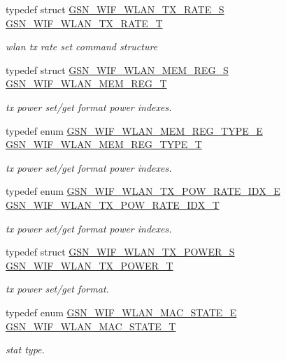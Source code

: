 \begin{DoxyCompactItemize}
typedef struct \hyperlink{a00409}{GSN\_\-WIF\_\-WLAN\_\-TX\_\-RATE\_\-S} \hyperlink{a00677_ga3248623873f75304b338528b6c711975}{GSN\_\-WIF\_\-WLAN\_\-TX\_\-RATE\_\-T}
\begin{DoxyCompactList}\small\item\em wlan tx rate set command structure \end{DoxyCompactList}\item 
typedef struct \hyperlink{a00390}{GSN\_\-WIF\_\-WLAN\_\-MEM\_\-REG\_\-S} \hyperlink{a00677_ga9d8aade166418018f4e609e679f7c603}{GSN\_\-WIF\_\-WLAN\_\-MEM\_\-REG\_\-T}
\begin{DoxyCompactList}\small\item\em tx power set/get format power indexes. \end{DoxyCompactList}\item 
typedef enum \hyperlink{a00677_ga7f657dfcb65c6810c23ae68bbca0b101}{GSN\_\-WIF\_\-WLAN\_\-MEM\_\-REG\_\-TYPE\_\-E} \hyperlink{a00677_gad221ad803b8f2c5c4e24ef1f0c0aa83c}{GSN\_\-WIF\_\-WLAN\_\-MEM\_\-REG\_\-TYPE\_\-T}
\begin{DoxyCompactList}\small\item\em tx power set/get format power indexes. \end{DoxyCompactList}\item 
typedef enum \hyperlink{a00677_ga75fc31972dc5127c4ee4b3e585ab0206}{GSN\_\-WIF\_\-WLAN\_\-TX\_\-POW\_\-RATE\_\-IDX\_\-E} \hyperlink{a00677_gaa864eedc8e384ed0ea49b62f267aff72}{GSN\_\-WIF\_\-WLAN\_\-TX\_\-POW\_\-RATE\_\-IDX\_\-T}
\begin{DoxyCompactList}\small\item\em tx power set/get format power indexes. \end{DoxyCompactList}\item 
typedef struct \hyperlink{a00408}{GSN\_\-WIF\_\-WLAN\_\-TX\_\-POWER\_\-S} \hyperlink{a00677_ga04f719a66b056bce000089417b9775bf}{GSN\_\-WIF\_\-WLAN\_\-TX\_\-POWER\_\-T}
\begin{DoxyCompactList}\small\item\em tx power set/get format. \end{DoxyCompactList}\item 
typedef enum \hyperlink{a00677_gaf26e714e09b57b3b2a5f21341613761d}{GSN\_\-WIF\_\-WLAN\_\-MAC\_\-STATE\_\-E} \hyperlink{a00677_gabb160daeefaad3c313cfd17480013311}{GSN\_\-WIF\_\-WLAN\_\-MAC\_\-STATE\_\-T}
\begin{DoxyCompactList}\small\item\em stat type. \end{DoxyCompactList}\item 

\end{DoxyCompactItemize}
